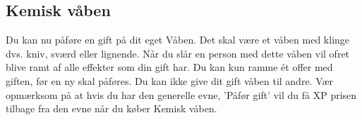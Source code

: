 \subsection{Kemisk våben}
Du kan nu påføre en gift på dit eget Våben. Det skal være et våben med klinge dvs. kniv, sværd eller lignende. Når du slår en person med dette våben vil ofret blive ramt af alle effekter som din gift har. Du kan kun ramme ét offer med giften, før en ny skal påføres. Du kan ikke give dit gift våben til andre. Vær opmærksom på at hvis du har den generelle evne, 'Påfør gift' vil du få XP prisen tilbage fra den evne når du køber Kemisk våben.\\